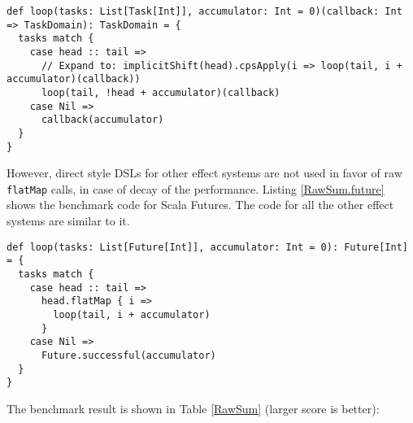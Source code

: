 \begin{lstlisting}[caption={The most efficient implementation of sum based on vanilla CPS function},label={RawSum.dsl}]
def loop(tasks: List[Task[Int]], accumulator: Int = 0)(callback: Int => TaskDomain): TaskDomain = {
  tasks match {
    case head :: tail =>
      // Expand to: implicitShift(head).cpsApply(i => loop(tail, i + accumulator)(callback))
      loop(tail, !head + accumulator)(callback)
    case Nil =>
      callback(accumulator)
  }
}
\end{lstlisting}

However, direct style DSLs for other effect systems are not used in favor of raw \lstinline{flatMap} calls, in case of decay of the performance. Listing \ref{RawSum.future} shows the benchmark code for Scala Futures. The code for all the other effect systems are similar to it.

\begin{lstlisting}[caption={The most efficient implementation of sum based on Scala Futures},label={RawSum.future}]
def loop(tasks: List[Future[Int]], accumulator: Int = 0): Future[Int] = {
  tasks match {
    case head :: tail =>
      head.flatMap { i =>
        loop(tail, i + accumulator)
      }
    case Nil =>
      Future.successful(accumulator)
  }
}
\end{lstlisting}

The benchmark result is shown in Table \ref{RawSum} (larger score is better):

